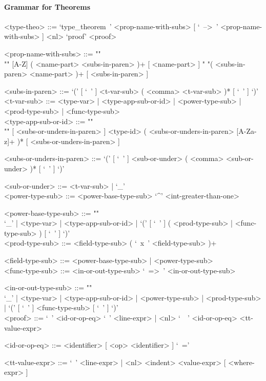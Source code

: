 \documentclass{article}
\begin{document}
\newpage

\paragraph{Grammar for Theorems}

\begin{grammar}
<type-theo> ::=
`type_theorem\ ' <prop-name-with-subs> [ `\ -->\ ' <prop-name-with-subs> ] <nl>
`proof' <proof>

<prop-name-with-subs> ::=  ""\\""
[A-Z] ( <name-part> <subs-in-paren> )+ [ <name-part> ]
\alt " "( <subs-in-paren> <name-part> )+ [ <subs-in-paren> ]

<subs-in-paren> ::=
`(' [ `\ ' ] <t-var-sub> ( <comma> <t-var-sub> )* [ `\ ' ] `)'
\\

<t-var-sub> ::=
<type-var> | <type-app-sub-or-id> | <power-type-sub> | <prod-type-sub> |
<func-type-sub>
\\

<type-app-sub-or-id> ::= ""\\""
[ <subs-or-unders-in-paren> ]
<type-id> ( <subs-or-unders-in-paren> [A-Za-z]+ )*
[ <subs-or-unders-in-paren> ]

<subs-or-unders-in-paren> ::=
`(' [ `\ ' ] <sub-or-under> ( <comma> <sub-or-under> )* [ `\ ' ] `)'

<sub-or-under> ::= <t-var-sub> | `_'
\\

<power-type-sub> ::= <power-base-type-sub> `^' <int-greater-than-one>

<power-base-type-sub> ::= ""\\
`_' | <type-var> | <type-app-sub-or-id> |
`(' [ `\ ' ] ( <prod-type-sub> | <func-type-sub> ) [ `\ ' ] `)'
\\

<prod-type-sub> ::= <field-type-sub> ( `\ x\ ' <field-type-sub> )+

<field-type-sub> ::= <power-base-type-sub> | <power-type-sub>
\\

<func-type-sub> ::= <in-or-out-type-sub> `\ =>\ ' <in-or-out-type-sub>

<in-or-out-type-sub> ::= ""\\
`_' | <type-var> | <type-app-sub-or-id> | <power-type-sub> | <prod-type-sub> |
`(' [ `\ ' ] <func-type-sub> [ `\ ' ] `)'
\\

<proof> ::=
`\ ' <id-or-op-eq> `\ ' <line-expr> |
<nl> `\ \ ' <id-or-op-eq>  <tt-value-expr>

<id-or-op-eq> ::= <identifier> [ <op> <identifier> ] `\ ='

<tt-value-expr> ::=
`\ ' <line-expr> | <nl> <indent> <value-expr> [ <where-expr> ]
\end{grammar}
\end{document}
